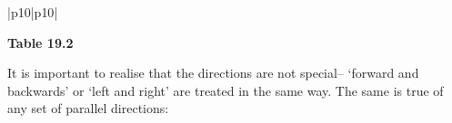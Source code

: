 \begin{center}
\begin{xtabular*}{\mytablewidth}[t]{|p{10\mystarwidth}|p{10\mystarwidth}|}
\begin{center}
      \vspace{2pt}
    \vspace{.1in}
    
    \end{center}



    \addtocounter{footnote}{-0}
    
     \tabularnewline{}
    \end{xtabular*}
      \end{center}
    \begin{center}{\small\bfseries Table 19.2}\end{center}
    
    \addtocounter{footnote}{-0}
    
    \par
  
        
        \label{m38813*id188697}It is important to realise that the directions are not special-- `forward
and backwards' or `left and right' are treated in the same way. The same is
true of any set of parallel directions:\par 
        
    
      
    
    \setlength\mytablespace{4\tabcolsep}
    \addtolength\mytablespace{3\arrayrulewidth}
    \setlength\mytablewidth{\linewidth}
        
    
    \setlength\mytableroom{\mytablewidth}
    \addtolength\mytableroom{-\mytablespace}
    
    \setlength\myfixedwidth{0pt}
    \setlength\mystarwidth{\mytableroom}
        \addtolength\mystarwidth{-\myfixedwidth}
        \divide{}
        
